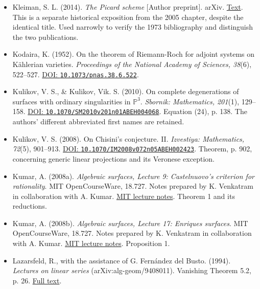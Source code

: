 \begin{sloppypar}
\begin{itemize}
\item Kleiman, S. L. (2014). \emph{The Picard scheme} {[}Author preprint{]}. arXiv. \href{https://arxiv.org/abs/1402.0409}{Text}. This is a separate historical exposition from the 2005 chapter, despite the identical title. Used narrowly to verify the 1973 bibliography and distinguish the two publications.

\item Kodaira, K. (1952). On the theorem of Riemann-Roch for adjoint systems on Kählerian varieties. \emph{Proceedings of the National Academy of Sciences, 38}(6), 522--527. \href{https://doi.org/10.1073/pnas.38.6.522}{DOI: \nolinkurl{10.1073/pnas.38.6.522}}.

\item Kulikov, V. S., \& Kulikov, Vik. S. (2010). On complete degenerations of surfaces with ordinary singularities in $\mathbb P^3$. \emph{Sbornik: Mathematics, 201}(1), 129--158. \href{https://doi.org/10.1070/SM2010v201n01ABEH004068}{DOI: \nolinkurl{10.1070/SM2010v201n01ABEH004068}}. Equation (24), p. 138. The authors' different abbreviated first names are retained.

\item Kulikov, V. S. (2008). On Chisini's conjecture. II. \emph{Izvestiya: Mathematics, 72}(5), 901--913. \href{https://doi.org/10.1070/IM2008v072n05ABEH002423}{DOI: \nolinkurl{10.1070/IM2008v072n05ABEH002423}}. Theorem, p. 902, concerning generic linear projections and its Veronese exception.

\item Kumar, A. (2008a). \emph{Algebraic surfaces, Lecture 9: Castelnuovo's criterion for rationality}. MIT OpenCourseWare, 18.727. Notes prepared by K. Venkatram in collaboration with A. Kumar. \href{https://ocw.mit.edu/courses/18-727-topics-in-algebraic-geometry-algebraic-surfaces-spring-2008/01d543f81d0b743f06deed68d9eec77d_lect9.pdf}{MIT lecture notes}. Theorem 1 and its reductions.

\item Kumar, A. (2008b). \emph{Algebraic surfaces, Lecture 17: Enriques surfaces}. MIT OpenCourseWare, 18.727. Notes prepared by K. Venkatram in collaboration with A. Kumar. \href{https://ocw.mit.edu/courses/18-727-topics-in-algebraic-geometry-algebraic-surfaces-spring-2008/9fa718160b9c9c0ecc0dceeaa339e644_lect17.pdf}{MIT lecture notes}. Proposition 1.

\item Lazarsfeld, R., with the assistance of G. Fern\'andez del Busto. (1994). \emph{Lectures on linear series} (arXiv:alg-geom/9408011). Vanishing Theorem 5.2, p. 26. \href{https://www.math.stonybrook.edu/~roblaz/Reprints/Lazarsfeld.LLS.pdf}{Full text}.


\end{itemize}
\end{sloppypar}
